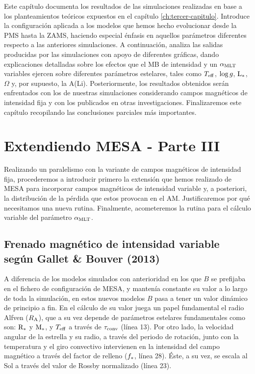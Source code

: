 Este capítulo documenta los resultados de las simulaciones realizadas en base a los planteamientos teóricos expuestos en el capítulo \ref{ch:tercer-capitulo}. Introduce la configuración aplicada a los modelos que hemos hecho evolucionar desde la PMS hasta la ZAMS, haciendo especial énfasis en aquellos parámetros diferentes respecto a las anteriores simulaciones. A continuación, analiza las salidas producidas por las simulaciones con apoyo de diferentes gráficas, dando explicaciones detalladas sobre los efectos que el MB de intensidad y un $\alpha_{\mathrm{MLT}}$ variables ejercen sobre diferentes parámetros estelares, tales como $T_{\mathrm{eff}}$, $\mathrm{log} \, g$, $\mathrm{L}_*$, $\Omega$ y, por supuesto, la A(Li). Posteriormente, los resultados obtenidos serán enfrentados con los de nuestras simulaciones considerando campos magnéticos de intensidad fija y con los publicados en otras investigaciones. Finalizaremos este capítulo recopilando las conclusiones parciales más importantes.\par

\section{Extendiendo MESA - Parte III}
Realizando un paralelismo con la variante de campos magnéticos de intensidad fija, procederemos a introducir primero la extensión que hemos realizado de MESA para incorporar campos magnéticos de intensidad variable y, a posteriori, la distribución de la pérdida que estos provocan en el AM. Justificaremos por qué necesitamos una nueva rutina. Finalmente, acometeremos la rutina para el cálculo variable del parámetro $\alpha_{\mathrm{MLT}}$.

\subsection{Frenado magnético de intensidad variable según Gallet \& Bouver (2013)} \label{sec:mb_var_b}
A diferencia de los modelos simulados con anterioridad en los que $B$ se prefijaba en el fichero de configuración de MESA, y mantenía constante su valor a lo largo de toda la simulación, en estos nuevos modelos $B$ pasa a tener un valor dinámico de principio a fin. En el cálculo de su valor juega un papel fundamental el radio Alfven ($R_{\mathrm{A}}$), que a su vez depende de parámetros estelares fundamentales como son: $\mathrm{R}_*$ y $\mathrm{M}_*$, y $T_{\mathrm{eff}}$ a través de $\tau_{\mathrm{conv}}$ (línea 13). Por otro lado, la velocidad angular de la estrella y su radio, a través del periodo de rotación, junto con la temperatura y el giro convectivo intervienen en la intensidad del campo magnético a través del factor de relleno ($f_{\mathrm{*}}$, línea 28). Éste, a su vez, se escala al Sol a través del valor de Rossby normalizado (línea 23).\par

